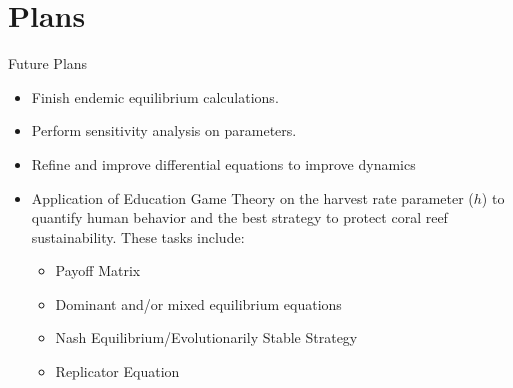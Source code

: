 \documentclass{beamer}
\begin{document}
\section{Plans}
\begin{frame}{Future Plans}
    \begin{itemize}
        \item Finish endemic equilibrium calculations.
        \item Perform sensitivity analysis on parameters.
        \item Refine and improve differential equations to improve dynamics
        \item Application of Education Game Theory on the harvest rate parameter ($h$) to quantify human behavior and the best strategy to protect coral reef sustainability. These tasks include:
        \begin{itemize}
            \item Payoff Matrix
            \item Dominant and/or mixed equilibrium equations
            \item Nash Equilibrium/Evolutionarily Stable Strategy
            \item Replicator Equation
        \end{itemize}
    \end{itemize}
\end{frame}



\end{document}
